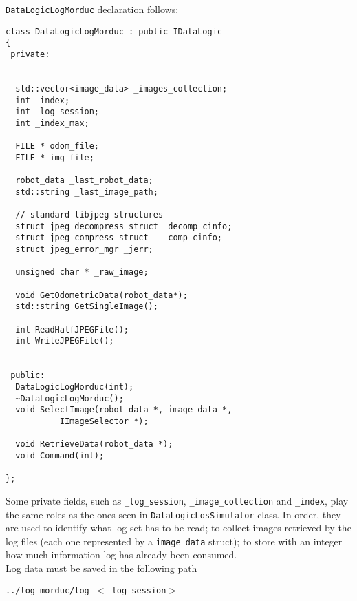 \texttt{DataLogicLogMorduc} declaration follows:
\\
\begin{lstlisting}[caption={\texttt{DataLogicLogMorduc} declaration},
    label={code:datalogiclogmorduc:declaration}]
class DataLogicLogMorduc : public IDataLogic
{
 private:

  
  std::vector<image_data> _images_collection;
  int _index;
  int _log_session;
  int _index_max;

  FILE * odom_file;
  FILE * img_file;

  robot_data _last_robot_data;
  std::string _last_image_path;

  // standard libjpeg structures
  struct jpeg_decompress_struct _decomp_cinfo;
  struct jpeg_compress_struct   _comp_cinfo;
  struct jpeg_error_mgr _jerr;

  unsigned char * _raw_image;
 
  void GetOdometricData(robot_data*);
  std::string GetSingleImage();

  int ReadHalfJPEGFile();
  int WriteJPEGFile();

  
 public:
  DataLogicLogMorduc(int);
  ~DataLogicLogMorduc();
  void SelectImage(robot_data *, image_data *,
		   IImageSelector *);

  void RetrieveData(robot_data *);
  void Command(int);

};
\end{lstlisting}

Some private fields, such as
\texttt{\_log\_session}, \texttt{\_image\_collection}
and \texttt{\_index}, play
the same roles as the ones seen in \texttt{DataLogicLosSimulator}
class. In order, they are used to identify what log set has
to be read; to collect images retrieved by the log files (each
one represented by a \texttt{image\_data} struct);
to store with an integer how much information log has already
been consumed.
\\
Log data must be saved in the following path

\begin{center}
  \texttt{../log\_morduc/log\_$<$\_log\_session$>$}
\end{center}


